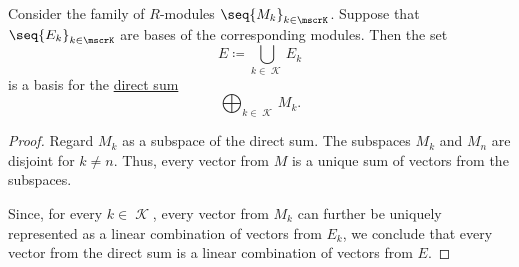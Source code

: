 \begin{proposition}\label{thm:basis_of_direct_sum}
  Consider the family of \( R \)-modules \( \seq{ M_k }_{k \in \mscrK} \). Suppose that \( \seq{ E_k }_{k \in \mscrK} \) are bases of the corresponding modules. Then the set
  \begin{equation*}
    E \coloneqq \bigcup_{k \in \mscrK} E_k
  \end{equation*}
  is a basis for the \hyperref[def:semimodule_direct_sum]{direct sum}
  \begin{equation*}
    \bigoplus_{k \in \mscrK} M_k.
  \end{equation*}
\end{proposition}
\begin{proof}
  Regard \( M_k \) as a subspace of the direct sum. The subspaces \( M_k \) and \( M_n \) are disjoint for \( k \neq n \). Thus, every vector from \( M \) is a unique sum of vectors from the subspaces.

  Since, for every \( k \in \mscrK \), every vector from \( M_k \) can further be uniquely represented as a linear combination of vectors from \( E_k \), we conclude that every vector from the direct sum is a linear combination of vectors from \( E \).
\end{proof}

